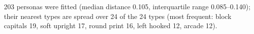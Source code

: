 203 personas were fitted (median distance 0.105, interquartile range 0.085--0.140); their nearest types are spread over 24 of the 24 types (most frequent: block capitals 19, soft upright 17, round print 16, left hooked 12, arcade 12).
